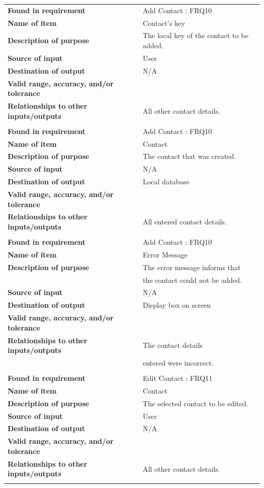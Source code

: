 \newpage
\begin{tabular}{ll}
\textbf{Found in requirement}&Add Contact : FRQ10\\
\textbf{Name of item}&Contact's key\\
\textbf{Description of purpose}&The local key of the contact to be added.\\
\textbf{Source of input}&User\\
\textbf{Destination of output}&N/A\\
\textbf{Valid range, accuracy, and/or tolerance}&\\
\textbf{Relationships to other inputs/outputs}&All other contact details.\\
&\\
\textbf{Found in requirement}&Add Contact : FRQ10\\
\textbf{Name of item}&Contact\\
\textbf{Description of purpose}&The contact that was created.\\
\textbf{Source of input}&N/A\\
\textbf{Destination of output}&Local database\\
\textbf{Valid range, accuracy, and/or tolerance}&\\
\textbf{Relationships to other inputs/outputs}&All entered contact details.\\
&\\
\textbf{Found in requirement}&Add Contact : FRQ10\\
\textbf{Name of item}&Error Message\\
\textbf{Description of purpose}&The error message informs that \\&the contact could not be added.\\
\textbf{Source of input}&N/A\\
\textbf{Destination of output}&Display box on screen\\
\textbf{Valid range, accuracy, and/or tolerance}&\\
\textbf{Relationships to other inputs/outputs}&The contact details \\& entered were incorrect.\\
&\\
\textbf{Found in requirement}&Edit Contact : FRQ11\\
\textbf{Name of item}&Contact\\
\textbf{Description of purpose}&The selected contact to be edited.\\
\textbf{Source of input}&User\\
\textbf{Destination of output}&N/A\\
\textbf{Valid range, accuracy, and/or tolerance}&\\
\textbf{Relationships to other inputs/outputs}&All other contact details.\\
&\\
\end{tabular}
